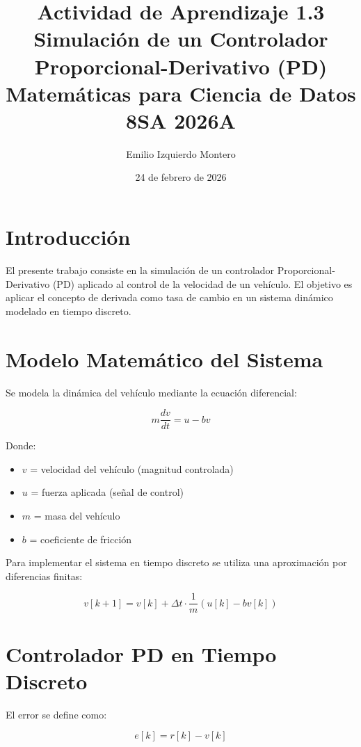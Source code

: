 \documentclass[12pt]{article}
\title{Actividad de Aprendizaje 1.3 \\ 
Simulación de un Controlador Proporcional-Derivativo (PD) \\ 
Matemáticas para Ciencia de Datos 8SA 2026A}
\author{Emilio Izquierdo Montero}
\date{24 de febrero de 2026}
\begin{document}
\maketitle

\section{Introducción}

El presente trabajo consiste en la simulación de un controlador Proporcional-Derivativo (PD) aplicado al control de la velocidad de un vehículo. 
El objetivo es aplicar el concepto de derivada como tasa de cambio en un sistema dinámico modelado en tiempo discreto.

\section{Modelo Matemático del Sistema}

Se modela la dinámica del vehículo mediante la ecuación diferencial:

\begin{equation}
m \frac{dv}{dt} = u - b v
\end{equation}

Donde:

\begin{itemize}
\item $v$ = velocidad del vehículo (magnitud controlada)
\item $u$ = fuerza aplicada (señal de control)
\item $m$ = masa del vehículo
\item $b$ = coeficiente de fricción
\end{itemize}

Para implementar el sistema en tiempo discreto se utiliza una aproximación por diferencias finitas:

\begin{equation}
v[k+1] = v[k] + \Delta t \cdot \frac{1}{m} (u[k] - b v[k])
\end{equation}

\section{Controlador PD en Tiempo Discreto}

El error se define como:

\begin{equation}
e[k] = r[k] - v[k]
\end{equation}
\end{document}
